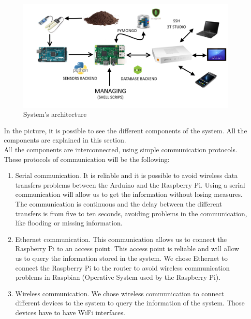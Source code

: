 \begin{figure}[H]
\begin{centering}
\includegraphics[scale=0.15]{IMGS/SYSTEM_SCHEMA.png}
\caption{System's architecture \label{System's architecture}}
\end{centering}
\end{figure}

In the picture, it is possible to see the different components of the system. All the components are explained in this section.\\

All the components are interconnected, using simple communication protocols. These protocols of communication will be the following:

\begin{enumerate}

\item Serial communication. It is reliable and it is possible to avoid wireless data transfers problems between the Arduino and the Raspberry Pi. Using a serial communication will allow us to get the information without losing measures. The communication is continuous and the delay between the different transfers is from five to ten seconds, avoiding problems in the communication, like flooding or missing information.

\item Ethernet communication. This communication allows us to connect the Raspberry Pi to an access point. This access point is reliable and will allow us to query the information stored in the system. We chose Ethernet to connect the Raspberry Pi to the router to avoid wireless communication problems in Raspbian (Operative System used by the Raspberry Pi).

\item Wireless communication. We chose wireless communication to connect different devices to the system to query the information of the system. Those devices have to have WiFi interfaces.

\end{enumerate}

